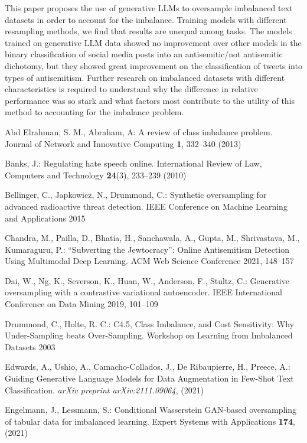 \documentclass[runningheads]{llncs}
\begin{document}
This paper proposes the use of generative LLMs to oversample imbalanced text datasets in order to account for the imbalance. Training models with different resampling methods, we find that results are unequal among tasks. The models trained on generative LLM data showed no improvement over other models in the binary classification of social media posts into an antisemitic/not antisemitic dichotomy, but they showed great improvement on the classification of tweets into types of antisemitism. Further research on imbalanced datasets with different characteristics is required to understand why the difference in relative performance was so stark and what factors most contribute to the utility of this method to accounting for the imbalance problem.

\begin{thebibliography}{31}
Abd Elrahman, S. M., Abraham, A: A review of class imbalance problem. Journal of Network and Innovative Computing \textbf{1}, 332--340 (2013)

Banks, J.: Regulating hate speech online. International Review of Law, Computers and Technology \textbf{24}(3), 233--239 (2010)

Bellinger, C., Japkowicz, N., Drummond, C.: Synthetic oversampling for advanced radioactive threat detection. IEEE Conference on Machine Learning and Applications 2015

Chandra, M., Pailla, D., Bhatia, H., Sanchawala, A., Gupta, M., Shrivastava, M., Kumaraguru, P.: ``Subverting the Jewtocracy'': Online Antisemitism Detection Using Multimodal Deep Learning. ACM Web Science Conference 2021, 148--157

Dai, W., Ng, K., Severson, K., Huan, W., Anderson, F., Stultz, C.: Generative oversampling with a contrastive variational autoencoder. IEEE International Conference on Data Mining 2019, 101--109

Drummond, C., Holte, R. C.: C4.5, Class Imbalance, and Cost Sensitivity: Why Under-Sampling beats Over-Sampling. Workshop on Learning from Imbalanced Datasets 2003

Edwards, A., Ushio, A., Camacho-Collados, J., De Ribaupierre, H., Preece, A.: Guiding Generative Language Models for Data Augmentation in Few-Shot Text Classification. \emph{arXiv preprint arXiv:2111.09064}, (2021)

Engelmann, J., Lessmann, S.: Conditional Wasserstein GAN-based oversampling of tabular data for imbalanced learning. Expert Systems with Applications \textbf{174}, (2021)


\end{thebibliography}
\end{document}
